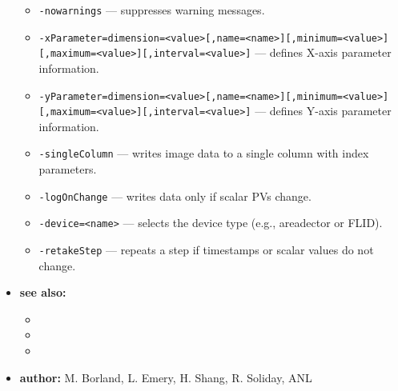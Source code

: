 \begin{itemize}
\begin{itemize}
  \item {\tt -nowarnings} --- suppresses warning messages.
  \item {\verb+-xParameter=dimension=<value>[,name=<name>][,minimum=<value>][,maximum=<value>][,interval=<value>]+} ---
        defines X-axis parameter information.
  \item {\verb+-yParameter=dimension=<value>[,name=<name>][,minimum=<value>][,maximum=<value>][,interval=<value>]+} ---
        defines Y-axis parameter information.
  \item {\tt -singleColumn} --- writes image data to a single column with index parameters.
  \item {\tt -logOnChange} --- writes data only if scalar PVs change.
  \item {\verb+-device=<name>+} --- selects the device type (e.g., areadector or FLID).
  \item {\tt -retakeStep} --- repeats a step if timestamps or scalar values do not change.
  \end{itemize}
\item {\bf see also:}
  \begin{itemize}
  \item {}
  \item {}
  \item {}
  \end{itemize}
\item {\bf author:} M. Borland, L. Emery, H. Shang, R. Soliday, ANL
\end{itemize}
